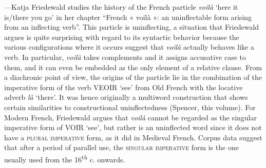 \documentclass[output=paper]{langscibook}
\begin{document}
---Katja Friedewald studies the history of the French particle \emph{voilà} `here it is/there you go' in her chapter ``French « voilà »: an uninflectable form arising from an inflecting verb''. This particle is uninflecting, a situation that Friedewald argues is quite surprising with regard to its syntactic behavior because the various configurations where it occurs suggest that \emph{voilà} actually	behaves like a verb. In particular, \emph{voilà} takes complements and it assigns accusative case to them, and it can even be embedded as the only element of a relative clause. From a diachronic point of view, the origins of the particle lie in the combination of the imperative form of the verb VEOIR `see' from Old French with the locative adverb \emph{là} `there'. It was hence originally a multiword construction that shows certain similarities to constructional uninflectedness (Spencer, this volume). For Modern French, Friedewald argues that \emph{voilà} cannot be regarded as the singular imperative form of VOIR `see', but rather is an uninflected word since it does not have a \textsc{plural imperative} form, as it did in Medieval French. Corpus data suggest that after a period of parallel use, the \textsc{singular imperative} form is the one usually used from the 16\textsuperscript{th} c. onwards.
\end{document}
